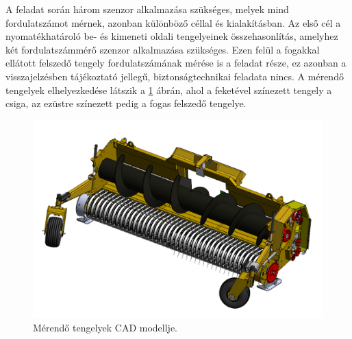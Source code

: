 A feladat során három szenzor alkalmazása szükséges, melyek mind fordulatszámot mérnek, azonban különböző céllal és kialakításban. Az első cél a nyomatékhatároló be- és kimeneti oldali tengelyeinek összehasonlítás, amelyhez két fordulatszámmérő szenzor alkalmazása szükséges. Ezen felül a fogakkal ellátott felszedő tengely fordulatszámának mérése is a feladat része, ez azonban a visszajelzésben tájékoztató jellegű, biztonságtechnikai feladata nincs. A mérendő tengelyek elhelyezkedése látszik a \ref{merendo_tengelyek} ábrán, ahol a feketével színezett tengely a csiga, az ezüstre színezett pedig a fogas felszedő tengelye.
\begin{figure}
	\centering
	\includegraphics[width=\columnwidth*6/10]{figures/merendo_tengelyek.png}
	\caption{Mérendő tengelyek CAD modellje.}
	\label{merendo_tengelyek}
\end{figure}

